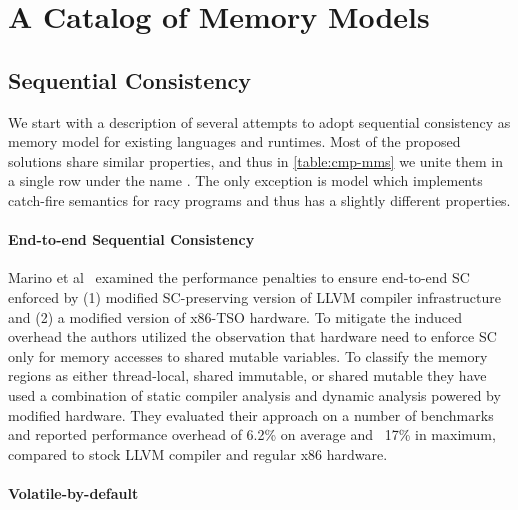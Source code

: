 \section{A Catalog of Memory Models}
\label{sec:catalog}





\subsection{Sequential Consistency}
\label{sec:catalog:sc}

We start with a description of several attempts 
to adopt sequential consistency as memory model for 
existing languages and runtimes. 
Most of the proposed solutions share similar properties, 
and thus in \cref{table:cmp-mms} we unite them 
in a single row under the name \SC. 
The only exception is \DRFx model which implements
catch-fire semantics for racy programs 
and thus has a slightly different properties. 

\paragraph{End-to-end Sequential Consistency}

Marino et al~\cite{Marino-al:PLDI11, Singh-al:ISCA12} 
examined the performance penalties to ensure end-to-end SC
enforced by (1) modified SC-preserving version 
of LLVM compiler infrastructure and 
(2) a modified version of x86-TSO hardware. 
To mitigate the induced overhead the authors 
utilized the observation that hardware need to 
enforce SC only for memory accesses to shared mutable variables. 
To classify the memory regions as either thread-local,
shared immutable, or shared mutable they have used 
a combination of static compiler analysis and 
dynamic analysis powered by modified hardware. 
They evaluated their approach on a number of benchmarks
and reported performance overhead of 6.2\% on average 
and ~17\% in maximum, compared to stock LLVM compiler 
and regular x86 hardware. 

\paragraph{Volatile-by-default}

